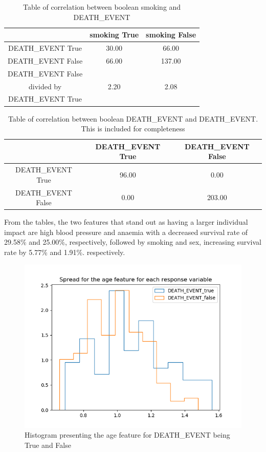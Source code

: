 \documentclass[a4paper, UKenglish]{article}
\newcommand{\0}{\mathbf{0}}
\newcommand{\1}{\mathbf{1}}
\begin{document}
\begin{table}[H]
\centering
\caption{Table of correlation between boolean smoking and DEATH\_EVENT}
\label{tab:smoking}
\begin{tabular}{|c||c|c|}
    \hline
       & smoking True   & smoking False   \\
    \hline
    \hline
    DEATH{\_}EVENT True & 30.00  & 66.00 \\
    \hline
    DEATH{\_}EVENT False & 66.00 & 137.00  \\
    \hline
    \hline
    DEATH{\_}EVENT False & & \\
    divided by & 2.20 & 2.08 \\
    DEATH{\_}EVENT True & & \\
    \hline
\end{tabular}
\end{table}

\begin{table}[H]
\centering
\caption{Table of correlation between boolean DEATH{\_}EVENT and DEATH\_EVENT. This is included for completeness}
\label{tab:DEATH_EVENT}
\begin{tabular}{|c||c|c|}
    \hline
       & DEATH\_EVENT True   & DEATH\_EVENT False   \\
    \hline
    \hline
    DEATH{\_}EVENT True & 96.00  & 0.00 \\
    \hline
    DEATH{\_}EVENT False & 0.00 & 203.00  \\
    \hline
\end{tabular}
\end{table}

From the tables, the two features that stand out as having a larger individual impact are high blood pressure and anaemia with a decreased survival rate of 29.58\% and 25.00\%, respectively, followed by smoking and sex, increasing survival rate by 5.77\% and  1.91\%. respectively.


\begin{figure}[H]
        \centering
        \includegraphics[scale=0.6]{images/age.png}
        \caption{Histogram presenting the age feature for DEATH{\_}EVENT being True and False}
        \label{fig:age}
\end{figure}
\end{document}
